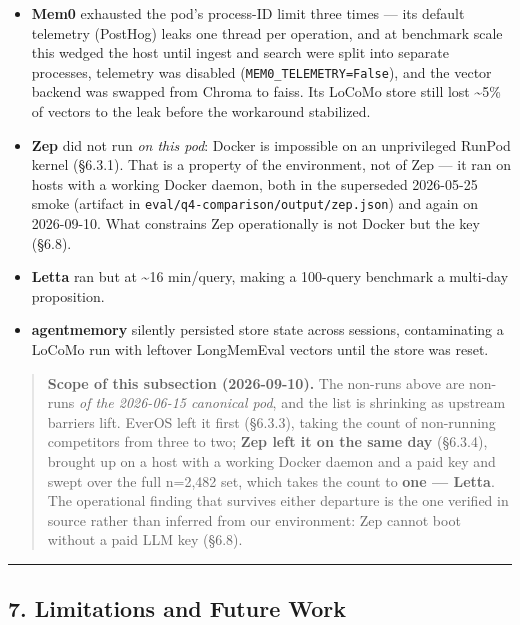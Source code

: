 \documentclass[
]{article}
\providecommand{\tightlist}{%
  \setlength{\itemsep}{0pt}\setlength{\parskip}{0pt}}
\begin{document}
\begin{itemize}
\tightlist
\item
  \textbf{Mem0} exhausted the pod's process-ID limit three times --- its
  default telemetry (PostHog) leaks one thread per operation, and at
  benchmark scale this wedged the host until ingest and search were
  split into separate processes, telemetry was disabled
  (\texttt{MEM0\_TELEMETRY=False}), and the vector backend was swapped
  from Chroma to faiss. Its LoCoMo store still lost \textasciitilde5\%
  of vectors to the leak before the workaround stabilized.
\item
  \textbf{Zep} did not run \emph{on this pod}: Docker is impossible on
  an unprivileged RunPod kernel (§6.3.1). That is a property of the
  environment, not of Zep --- it ran on hosts with a working Docker
  daemon, both in the superseded 2026-05-25 smoke (artifact in
  \texttt{eval/q4-comparison/output/zep.json}) and again on 2026-09-10.
  What constrains Zep operationally is not Docker but the key (§6.8).
\item
  \textbf{Letta} ran but at \textasciitilde16 min/query, making a
  100-query benchmark a multi-day proposition.
\item
  \textbf{agentmemory} silently persisted store state across sessions,
  contaminating a LoCoMo run with leftover LongMemEval vectors until the
  store was reset.
\end{itemize}

\begin{quote}
\textbf{Scope of this subsection (2026-09-10).} The non-runs above are
non-runs \emph{of the 2026-06-15 canonical pod}, and the list is
shrinking as upstream barriers lift. EverOS left it first (§6.3.3),
taking the count of non-running competitors from three to two;
\textbf{Zep left it on the same day} (§6.3.4), brought up on a host with
a working Docker daemon and a paid key and swept over the full n=2,482
set, which takes the count to \textbf{one --- Letta}. The operational
finding that survives either departure is the one verified in source
rather than inferred from our environment: Zep cannot boot without a
paid LLM key (§6.8).
\end{quote}

\begin{center}\rule{0.5\linewidth}{0.5pt}\end{center}

\subsection{7. Limitations and Future
Work}\label{limitations-and-future-work}
\end{document}

